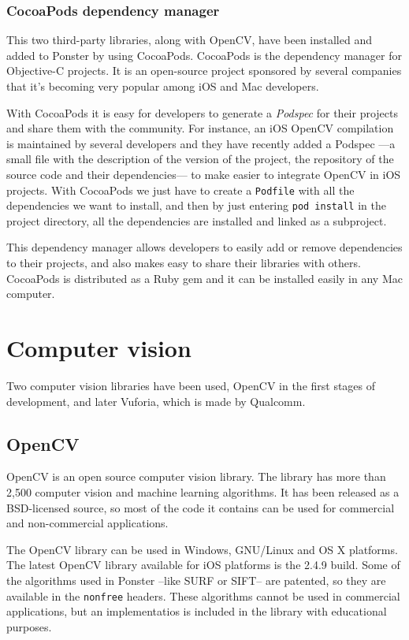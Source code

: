 \subsubsection{CocoaPods dependency manager}
This two third-party libraries, along with OpenCV, have been installed and added to
Ponster by using CocoaPods. CocoaPods is the dependency manager for Objective-C
projects\cite{cocoapods}. It is an open-source project sponsored by several
companies that it's becoming very popular among iOS and Mac developers.

With CocoaPods it is easy for developers to generate a \emph{Podspec} for their
projects and share them with the community. For instance, an iOS OpenCV compilation
is maintained by several developers and they have recently added a Podspec ---a small
file with the description of the version of the project, the repository of the
source code and their dependencies--- to make easier to integrate OpenCV in iOS
projects. With CocoaPods we just have to create a \texttt{Podfile} with all the
dependencies we want to install, and then by just entering \texttt{pod install} in
the project directory, all the dependencies are installed and linked as a
subproject.

This dependency manager allows developers to easily add or remove dependencies to
their projects, and also makes easy to share their libraries with others. CocoaPods
is distributed as a Ruby gem and it can be installed easily in any Mac computer.

\section{Computer vision}
Two computer vision libraries have been used, OpenCV in the first stages of
development, and later Vuforia, which is made by Qualcomm\textregistered. 

\subsection{OpenCV}
OpenCV is an open source computer vision library\cite{opencv}. The library has
more than 2,500 computer vision and machine learning algorithms. It has been
released as a BSD-licensed source, so most of the code it contains can be used for
commercial and non-commercial applications.

The OpenCV library can be used in Windows, GNU/Linux and OS X platforms. The
latest OpenCV library available for iOS platforms is the 2.4.9
build\cite{opencvpod}. Some of the algorithms used in Ponster --like SURF or SIFT--
are patented, so they are available in the \texttt{nonfree} headers. These
algorithms cannot be used in commercial applications, but an implementatios is
included in the library with educational purposes. 

